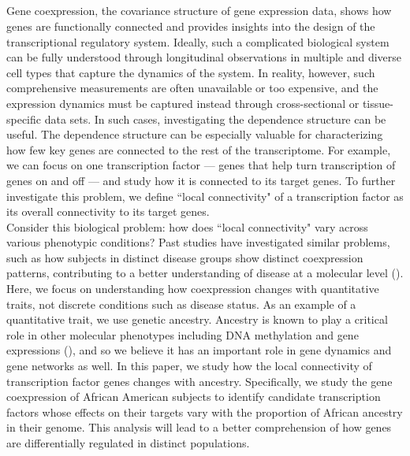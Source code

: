 \documentclass[aap,authoryear, preprint]{imsart}
\numberwithin{equation}{section}
\theoremstyle{plain}
\begin{document}
\subsection*{}
Gene coexpression, the covariance structure of gene expression data, shows how genes are functionally connected and provides insights into the design of the transcriptional regulatory system. Ideally, such a complicated biological system can be fully understood through longitudinal observations in multiple and diverse cell types that capture the dynamics of the system. In reality, however, such comprehensive measurements are often unavailable or too expensive, and the expression dynamics must be captured instead through cross-sectional or tissue-specific data sets. In such cases, investigating the dependence structure can be useful. The dependence structure can be especially valuable for characterizing how few key genes are connected to the rest of the transcriptome. For example, we can focus on one transcription factor --- genes that help turn transcription of genes on and off --- and study how it is connected to its target genes. To further investigate this problem, we define ``local connectivity" of a transcription factor as its overall connectivity to its target genes.\\

Consider this biological problem: how does ``local connectivity" vary across various phenotypic conditions?  Past studies have investigated similar problems, such as how subjects in distinct disease groups show distinct coexpression patterns, contributing to a better understanding of disease at a molecular level (\cite{de2010differential}). Here, we focus on understanding how coexpression changes with quantitative traits, not discrete conditions such as disease status. As an example of a quantitative trait, we use genetic ancestry. Ancestry is known to play a critical role in other molecular phenotypes including DNA methylation and gene expressions (\cite{galanter2017differential, price2008effects}), and so we believe it has an important role in gene dynamics and gene networks as well. In this paper, we study how the local connectivity of transcription factor genes changes with ancestry. Specifically, we study the gene coexpression of African American subjects to identify candidate transcription factors whose effects on their targets vary with the proportion of African ancestry in their genome. This analysis will lead to a better comprehension of how genes are differentially regulated in distinct populations. \\
\end{document}
